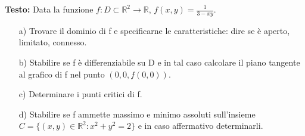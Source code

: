 \documentclass[12pt, a4paper]{article}
\begin{document}
\textbf{Testo:} Data la funzione $f: D \subset \mathbb{R}^{2} \rightarrow \mathbb{R}$, $f(x,y) = \frac{1}{3-xy}$.
\begin{enumerate}
    \item[a)] Trovare il dominio di f e specificarne le caratteristiche: dire se è aperto, limitato, connesso.
    \item[b)] Stabilire se f è differenziabile su D e in tal caso calcolare il piano tangente al grafico di f nel punto $(0,0,f(0,0))$.
    \item[c)] Determinare i punti critici di f.
    \item[d)] Stabilire se f ammette massimo e minimo assoluti sull'insieme $C = \{(x,y) \in \mathbb{R}^{2} : x^{2}+y^{2}=2\}$ e in caso affermativo determinarli.
\end{enumerate}
\end{document}

